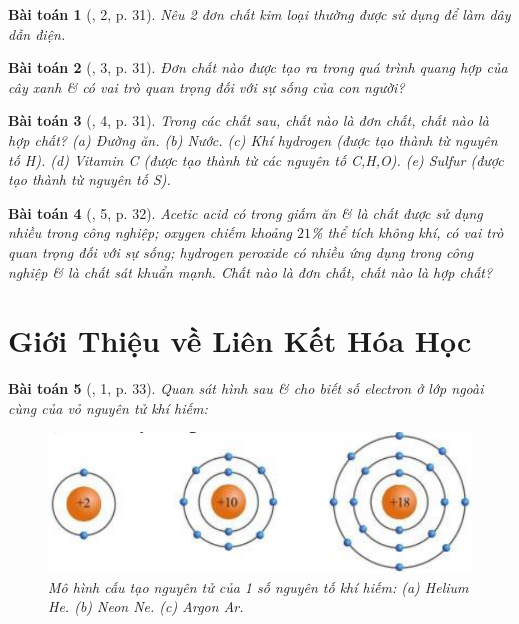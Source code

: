 \documentclass{article}
\newtheorem{baitoan}{Bài toán}
\begin{document}
\begin{baitoan}[\cite{SGK_KHTN_7_Canh_Dieu}, 2, p. 31]
	Nêu 2 đơn chất kim loại thường được sử dụng để làm dây dẫn điện.
\end{baitoan}

\begin{baitoan}[\cite{SGK_KHTN_7_Canh_Dieu}, 3, p. 31]
	Đơn chất nào được tạo ra trong quá trình quang hợp của cây xanh \& có vai trò quan trọng đối với sự sống của con người?
\end{baitoan}

\begin{baitoan}[\cite{SGK_KHTN_7_Canh_Dieu}, 4, p. 31]
	Trong các chất sau, chất nào là đơn chất, chất nào là hợp chất? (a) Đường ăn. (b) Nước. (c) Khí hydrogen (được tạo thành từ nguyên tố \emph{H}). (d) Vitamin C (được tạo thành từ các nguyên tố \emph{C,H,O}). (e) Sulfur (được tạo thành từ nguyên tố \emph{S}).
\end{baitoan}

\begin{baitoan}[\cite{SGK_KHTN_7_Canh_Dieu}, 5, p. 32]
	Acetic acid có trong giấm ăn \& là chất được sử dụng nhiều trong công nghiệp; oxygen chiếm khoảng $21$\% thể tích không khí, có vai trò quan trọng đối với sự sống; hydrogen peroxide có nhiều ứng dụng trong công nghiệp \& là chất sát khuẩn mạnh. Chất nào là đơn chất, chất nào là hợp chất?
\end{baitoan}


\section{Giới Thiệu về Liên Kết Hóa Học}

\begin{baitoan}[\cite{SGK_KHTN_7_Canh_Dieu}, 1, p. 33]
	Quan sát hình sau \& cho biết số electron ở lớp ngoài cùng của vỏ nguyên tử khí hiếm:
	\begin{figure}[H]
		\centering
		\includegraphics[scale=0.3]{helium_neon_argon}
		\caption{Mô hình cấu tạo nguyên tử của 1 số nguyên tố khí hiếm: (a) Helium He. (b) Neon Ne. (c) Argon Ar.}
	\end{figure}
\end{baitoan}
\end{document}
